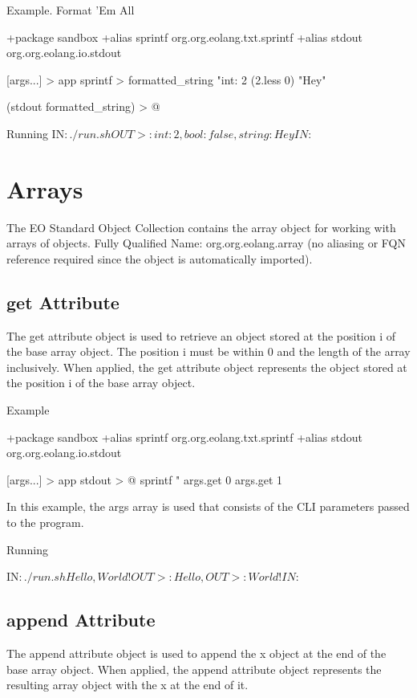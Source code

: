 \documentclass[12pt]{book}
\begin{document}
Example. Format 'Em All
\begin{ffcode}
+package sandbox
+alias sprintf org.org.eolang.txt.sprintf
+alias stdout org.org.eolang.io.stdout

[args...] > app
  sprintf > formatted_string
    "int: %
    2
    (2.less 0)
    "Hey"

  (stdout formatted_string) > @

Running
IN$: ./run.sh
OUT>: int: 2, bool: false, string: Hey
IN$: 
\end{ffcode}


\section{Arrays}
The EO Standard Object Collection contains the array object for working with arrays of objects.
Fully Qualified Name: org.org.eolang.array (no aliasing or FQN reference required since the object is automatically imported).

\subsection{get Attribute}
The get attribute object is used to retrieve an object stored at the position i of the base array object.
The position i must be within 0 and the length of the array inclusively.
When applied, the get attribute object represents the object stored at the position i of the base array object.

Example
\begin{ffcode}
+package sandbox
+alias sprintf org.org.eolang.txt.sprintf
+alias stdout org.org.eolang.io.stdout

[args...] > app
  stdout > @
    sprintf
      "%
      args.get 0
      args.get 1

\end{ffcode}

In this example, the args array is used that consists of the CLI parameters passed to the program.

Running
\begin{ffcode}
IN$: ./run.sh Hello, World!
OUT>: Hello,
OUT>: World!
IN$: 
\end{ffcode}

\subsection{append Attribute}
The append attribute object is used to append the x object at the end of the base array object.
When applied, the append attribute object represents the resulting array object with the x at the end of it.
\end{document}
